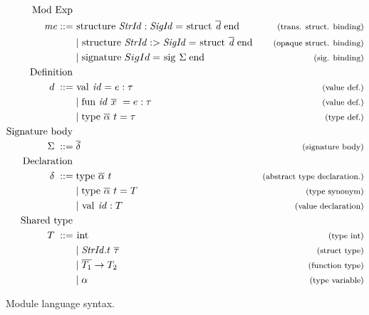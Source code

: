 \begin{figure}[!htb]
\begin{align*}
\begin{aligned}
%
\text{Mod Exp }\\
\mathit{me} ::= \; & \text{\lsttext{structure}} \;  \mathit{StrId : SigId} = \text{\lsttext{struct}}\; \overline{\mathit{d}}\; \text{\lsttext{end}}
                                             & \expl{(trans. struct. binding)}\\
&|\; \text{\lsttext{structure}} \;  \mathit{StrId :> SigId} = 
\text{\lsttext{struct}}\; \overline{\mathit{d}}\; \text{\lsttext{end}}
                                             & \expl{(opaque struct. binding)}\\
&|\; \text{\lsttext{signature}} \; SigId = 
\text{\lsttext{sig}}\; \Sigma \; \text{\lsttext{end}} 
                                             & \expl{(sig. binding)}\\
%
\text{Definition }\\
d \; ::= \; &\text{\lsttext{val}}\ \mathit{id}=e:\tau   & \expl{(value def.)} \\
& |\; \text{\lsttext{fun}}\  \mathit{id}\ \overline{x}\ =e:\tau   & \expl{(value def.)} \\
& |\; \text{\lsttext{type}}\ \ova\ t= \tau           & \expl{(type def.)} \\
%
\text{Signature body } \\
\Sigma \; ::= \; &\overline{\delta}                    & \expl{(signature body)}\\
%
\text{Declaration }\\
\delta \; ::= \; & \text{\lsttext{type}}\ \ova\ t  & \expl{(abstract type declaration.)} \\
& | \; \text{\lsttext{type}}\ \ova\ t = T          & \expl{(type synonym)} \\
& | \; \text{\lsttext{val}}\ \mathit{id}:T         & \expl{(value declaration)} \\
%
\text{Shared type } \\
T \; ::= \; &\text{\lsttext{int}}                  & \expl{(type int)} \\
&| \; \mathit{StrId}.t \ \overline{\tau}           & \expl{(struct type)}\\
&| \; \overline{T_{1}} \rightarrow T_{2}           & \expl{(function type)}\\
&| \; \alpha                                       & \expl{(type variable)}
\end{aligned}
\end{align*}
\caption[Syntax: Module Language]{Module language syntax. \label{fig:ModuleSyntax}}
\end{figure}
